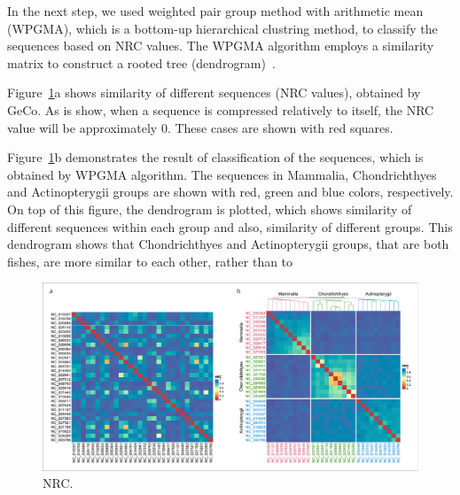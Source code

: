 \documentclass[extendedabs]{recpad2k}
\begin{document}
In the next step, we used weighted pair group method with arithmetic mean (WPGMA), which is a bottom-up hierarchical clustring method, to classify the sequences based on NRC values. The WPGMA algorithm employs a similarity matrix to construct a rooted tree (dendrogram)~\cite{sokal58a, clifford2011comparison}.

Figure~\ref{fig.nrc}a shows similarity of different sequences (NRC values), obtained by GeCo. As is show, when a sequence is compressed relatively to itself, the NRC value will be approximately 0. These cases are shown with red squares.

Figure~\ref{fig.nrc}b demonstrates the result of classification of the sequences, which is obtained by WPGMA algorithm. The sequences in Mammalia, Chondrichthyes and Actinopterygii groups are shown with red, green and blue colors, respectively. On top of this figure, the dendrogram is plotted, which shows similarity of different sequences within each group and also, similarity of different groups. This dendrogram shows that Chondrichthyes and Actinopterygii groups, that are both fishes, are more similar to each other, rather than to 

\begin{figure}
   \includegraphics[width=\textwidth]{fig.pdf}
   \caption{NRC.}
   \label{fig.nrc}
\end{figure}



\end{document}
